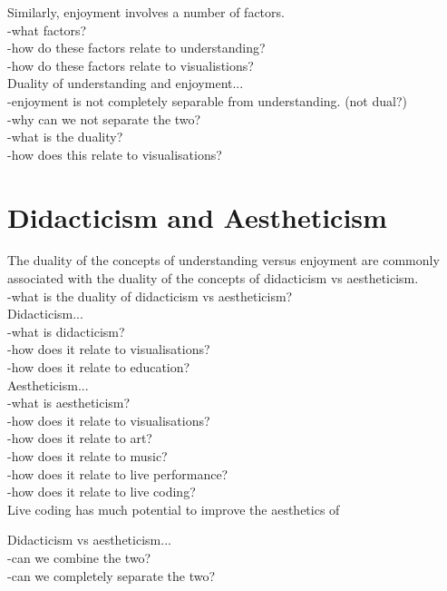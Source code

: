 Similarly, enjoyment involves a number of factors.\\
-what factors?\\
-how do these factors relate to understanding?\\
-how do these factors relate to visualistions?\\

Duality of understanding and enjoyment...\\
-enjoyment is not completely separable from understanding. (not dual?)\\
-why can we not separate the two?\\
-what is the duality?\\
-how does this relate to visualisations?\\


\section{Didacticism and Aestheticism}

The duality of the concepts of understanding versus enjoyment are commonly associated with the duality of the concepts of didacticism vs aestheticism.\\
-what is the duality of didacticism vs aestheticism?\\

Didacticism...\\
-what is didacticism?\\
-how does it relate to visualisations?\\
-how does it relate to education?\\

Aestheticism...\\
-what is aestheticism?\\
-how does it relate to visualisations?\\
-how does it relate to art?\\
-how does it relate to music?\\
-how does it relate to live performance?\\
-how does it relate to live coding? \cite{Bell}\\
Live coding has much potential to improve the aesthetics of 

Didacticism vs aestheticism...\\
-can we combine the two?\\
-can we completely separate the two?\\








